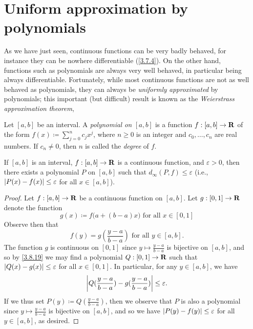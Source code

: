 \section{Uniform approximation by polynomials}\label{sec 3.8}

\begin{note}
  As we have just seen, continuous functions can be very badly behaved, for instance they can be nowhere differentiable (\cref{3.7.4}).
  On the other hand, functions such as polynomials are always very well behaved, in particular being always differentiable.
  Fortunately, while most continuous functions are not as well behaved as polynomials, they can always be \emph{uniformly approximated} by polynomials; this important (but difficult) result is known as the \emph{Weierstrass approximation theorem},
\end{note}

\begin{definition}\label{3.8.1}
  Let \([a, b]\) be an interval.
  A \emph{polynomial on \([a, b]\)} is a
  function \(f : [a, b] \to \mathbf{R}\) of the form \(f(x) \coloneqq \sum_{j = 0}^n c_j x^j\), where \(n \geq 0\) is an integer and \(c_0, \dots, c_n\) are real numbers.
  If \(c_n \neq 0\), then \(n\) is called the \emph{degree} of \(f\).
\end{definition}

\setcounter{theorem}{2}
\begin{theorem}\label{3.8.3}
  If \([a, b]\) is an interval, \(f : [a, b] \to \mathbf{R}\) is a continuous function, and \(\varepsilon > 0\), then there exists a polynomial \(P\) on \([a, b]\) such that \(d_\infty(P, f) \leq \varepsilon\)
  (i.e., \(\left\lvert P(x) - f(x)\right\rvert \leq \varepsilon\) for all \(x \in [a, b]\)).
\end{theorem}

\begin{proof}
  Let \(f : [a, b] \to \mathbf{R}\) be a continuous function on \([a, b]\).
  Let \(g : [0, 1] \to \mathbf{R}\) denote the function
  \[
    g(x) \coloneqq f\big(a + (b - a) x\big) \text{ for all } x \in [0, 1]
  \]
  Observe then that
  \[
    f(y) = g(\frac{y - a}{b - a}) \text{ for all } y \in [a, b].
  \]
  The function \(g\) is continuous on \([0, 1]\) since \(y \mapsto \frac{y - a}{b - a}\) is bijective on \([a, b]\), and so by \cref{3.8.19} we may find a polynomial \(Q : [0, 1] \to \mathbf{R}\) such that \(\left\lvert Q(x) - g(x)\right\rvert \leq \varepsilon\) for all \(x \in [0, 1]\).
  In particular, for any \(y \in [a, b]\), we have
  \[
    \left\lvert Q(\frac{y - a}{b - a}) - g(\frac{y - a}{b - a})\right\rvert \leq \varepsilon.
  \]
  If we thus set \(P(y) \coloneqq Q(\frac{y - a}{b - a})\), then we observe that \(P\) is also a polynomial since \(y \mapsto \frac{y - a}{b - a}\) is bijective on \([a, b]\), and so we have \(\left\lvert P(y) - f(y)\right\rvert \leq \varepsilon\) for all \(y \in [a, b]\), as desired.
\end{proof}

